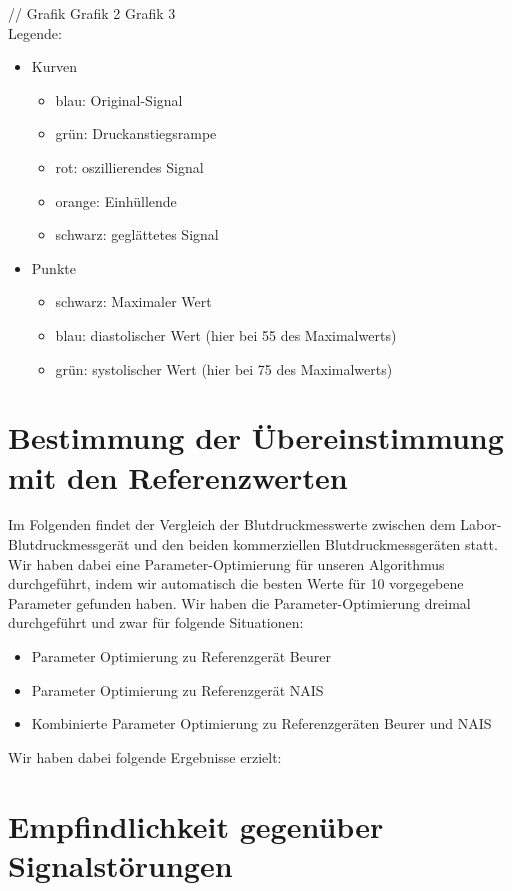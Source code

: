 \documentclass[a4paper, 11pt]{scrartcl}
\begin{document}
//
Grafik
Grafik 2
Grafik 3
\\

Legende:
\begin{itemize}
    \item Kurven
    \begin{itemize}
        \item blau: Original-Signal
        \item grün: Druckanstiegsrampe
        \item rot: oszillierendes Signal
        \item orange: Einhüllende
        \item schwarz: geglättetes Signal
    \end{itemize}
    \item Punkte
        \begin{itemize}
        \item schwarz: Maximaler Wert
        \item blau: diastolischer Wert (hier bei 55 des Maximalwerts)
        \item grün: systolischer Wert (hier bei 75 des Maximalwerts)
    \end{itemize}
    
\end{itemize}

\newpage

\section*{Bestimmung der Übereinstimmung mit den Referenzwerten}
Im Folgenden findet der Vergleich der Blutdruckmesswerte zwischen dem Labor-Blutdruckmessgerät und den beiden kommerziellen Blutdruckmessgeräten statt. 
Wir haben dabei eine Parameter-Optimierung für unseren Algorithmus durchgeführt, indem wir automatisch die besten Werte für 10 vorgegebene Parameter gefunden haben.
Wir haben die Parameter-Optimierung dreimal durchgeführt und zwar für folgende Situationen:

\begin{itemize}
    \item Parameter Optimierung zu Referenzgerät Beurer
    \item Parameter Optimierung zu Referenzgerät NAIS
    \item Kombinierte Parameter Optimierung zu Referenzgeräten Beurer und NAIS
\end{itemize}

Wir haben dabei folgende Ergebnisse erzielt:



\newpage

\section*{Empfindlichkeit gegenüber Signalstörungen}
   
\end{document}

